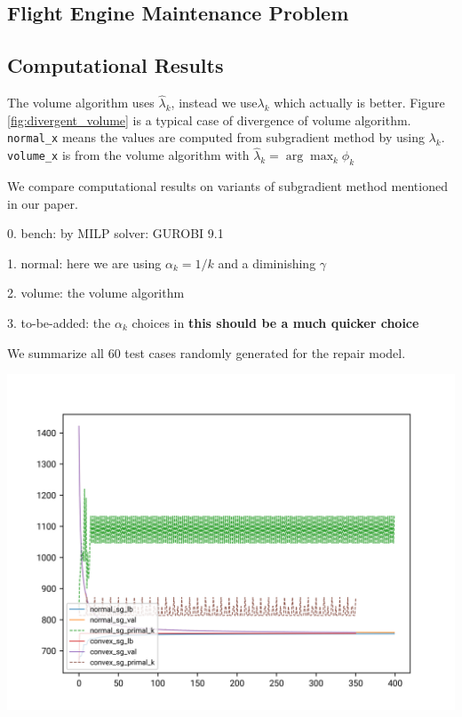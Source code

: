 \documentclass[../main]{subfiles}
\begin{document}



\subsection{Flight Engine Maintenance Problem}\label{repair}



\subsection{Computational Results}\label{computational-results}



The volume algorithm uses \(\hat \lambda_{k}\), instead we use\(\lambda_{k}\) which actually is better.
Figure \ref{fig:divergent_volume} is a typical case of divergence of volume algorithm.
\texttt{normal\_x} means the values are computed from subgradient
method by using \(\lambda_{k}\). \texttt{volume\_x} is from the volume
algorithm with \(\hat \lambda_{k} = \arg\max_k \hat \phi_{k}\)

We compare computational results on variants of subgradient method mentioned in our paper.

0. bench: by MILP solver: GUROBI 9.1

1. normal: here we are using \(\alpha_k = 1/k\) and a diminishing \(\gamma\)

2. volume: the volume algorithm

3. to-be-added: the \(\alpha_k\) choices in \cite{brannlund1995generalized} \textbf{this should be a much quicker choice}

We summarize all \(60\) test cases randomly generated for the repair model.



\includegraphics{../imgs/conv_0_15_15.png}
\label{fig:divergent_volume}
\end{document}
